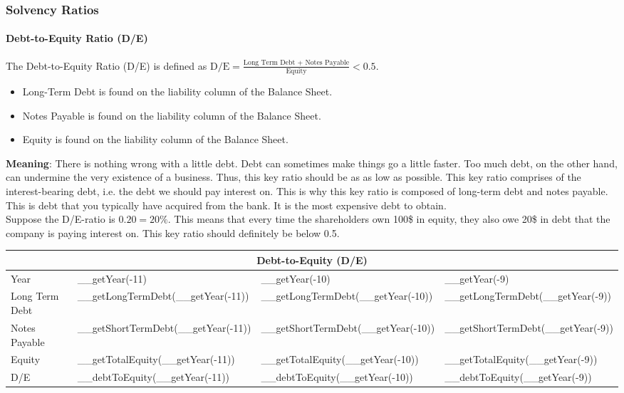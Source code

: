 \subsubsection{Solvency Ratios}

\paragraph{Debt-to-Equity Ratio (D/E)}

The Debt-to-Equity Ratio (D/E) is defined as
$\text{D/E} = \frac{\text{Long Term Debt + Notes Payable}}{\text{Equity}} < 0.5$.
\begin{itemize}
    \item Long-Term Debt is found on the liability column of the Balance Sheet.
    \item Notes Payable is found on the liability column of the Balance Sheet.
    \item Equity is found on the liability column of the Balance Sheet.
\end{itemize}
\textbf{Meaning}: There is nothing wrong with a little debt. Debt can sometimes
make things go a little faster. Too much debt, on the other hand, can undermine
the very existence of a business. Thus, this key ratio should be as as low as
possible. This key ratio comprises of the interest-bearing debt, i.e. the debt
we should pay interest on. This is why this key ratio is composed of long-term
debt and notes payable. This is debt that you typically have acquired from the
bank. It is the most expensive debt to obtain.\\
Suppose the D/E-ratio is $0.20 = 20\%$. This means that every time the shareholders
own 100\$ in equity, they also owe 20\$ in debt that the company is paying interest
on. This key ratio should definitely be below 0.5.\\

\begin{tabularx}{\textwidth}{|X|X|X|X|}
 \hline
 \multicolumn{4}{|c|}{Debt-to-Equity (D/E)} \\
 \hline
 Year                       & __getYear(-11)                        & __getYear(-10)                        & __getYear(-9)                     \\
 \hline
 Long Term Debt             & __getLongTermDebt(__getYear(-11))     & __getLongTermDebt(__getYear(-10))     & __getLongTermDebt(__getYear(-9))  \\
 Notes Payable              & __getShortTermDebt(__getYear(-11))    & __getShortTermDebt(__getYear(-10))    & __getShortTermDebt(__getYear(-9)) \\
 Equity                     & __getTotalEquity(__getYear(-11))      & __getTotalEquity(__getYear(-10))      & __getTotalEquity(__getYear(-9))   \\
 \rowcolor{lightgray} D/E   & __debtToEquity(__getYear(-11))        & __debtToEquity(__getYear(-10))        & __debtToEquity(__getYear(-9))     \\
 \hline
\end{tabularx}\\

